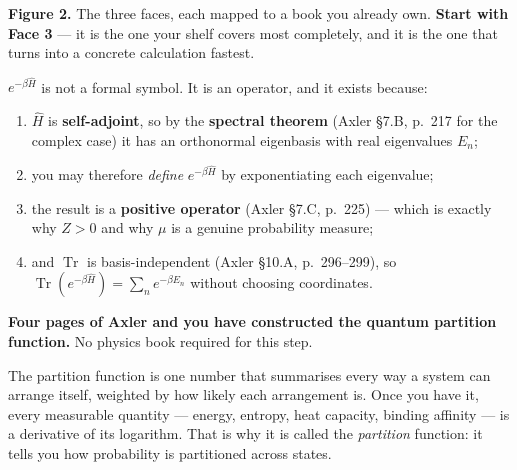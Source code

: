 \vspace{2pt}
\begin{center}\begin{minipage}{0.93\textwidth}\footnotesize\color{slate}
\textbf{Figure 2.}\; The three faces, each mapped to a book you already own.
\textbf{Start with Face 3} --- it is the one your shelf covers most completely, and it is the one that
turns into a concrete calculation fastest.
\end{minipage}\end{center}

\begin{keyidea}[title={Why Face 3 first, precisely}]
$e^{-\beta\hat H}$ is not a formal symbol. It is an operator, and it exists because:
\begin{enumerate}[label=\textbf{\arabic*.}]
\item $\hat H$ is \textbf{self-adjoint}, so by the \textbf{spectral theorem} (Axler §7.B, p.~217 for
 the complex case) it has an orthonormal eigenbasis with real eigenvalues $E_n$;
\item you may therefore \emph{define} $e^{-\beta\hat H}$ by exponentiating each eigenvalue;
\item the result is a \textbf{positive operator} (Axler §7.C, p.~225) --- which is exactly why
 $Z>0$ and why $\mu$ is a genuine probability measure;
\item and $\operatorname{Tr}$ is basis-independent (Axler §10.A, p.~296--299), so
 $\operatorname{Tr}(e^{-\beta\hat H})=\sum_n e^{-\beta E_n}$ without choosing coordinates.
\end{enumerate}
\textbf{Four pages of Axler and you have constructed the quantum partition function.} No physics
book required for this step.
\end{keyidea}

\begin{plain}
The partition function is one number that summarises every way a system can arrange itself, weighted
by how likely each arrangement is. Once you have it, every measurable quantity --- energy, entropy,
heat capacity, binding affinity --- is a derivative of its logarithm. That is why it is called the
\emph{partition} function: it tells you how probability is partitioned across states.
\end{plain}
